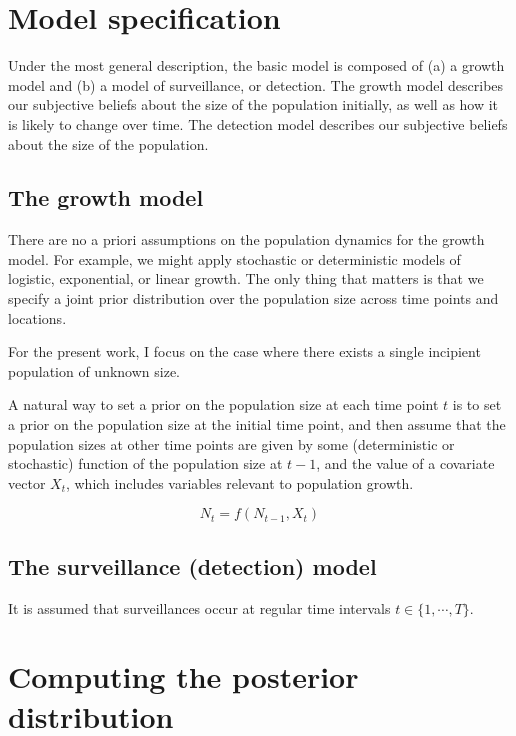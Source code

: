 \documentclass[
]{book}
\begin{document}
\hypertarget{model-specification-1}{%
\section{Model specification}\label{model-specification-1}}

Under the most general description, the basic model is composed of (a) a growth model and (b) a model of surveillance, or detection. The growth model describes our subjective beliefs about the size of the population initially, as well as how it is likely to change over time. The detection model describes our subjective beliefs about the size of the population.

\hypertarget{the-growth-model}{%
\subsection{The growth model}\label{the-growth-model}}

There are no a priori assumptions on the population dynamics for the growth model. For example, we might apply stochastic or deterministic models of logistic, exponential, or linear growth. The only thing that matters is that we specify a joint prior distribution over the population size across time points and locations.

For the present work, I focus on the case where there exists a single incipient population of unknown size.

A natural way to set a prior on the population size at each time point \(t\) is to set a prior on the population size at the initial time point, and then assume that the population sizes at other time points are given by some (deterministic or stochastic) function of the population size at \(t-1\), and the value of a covariate vector \(X_t\), which includes variables relevant to population growth.

\[
N_t = f(N_{t-1}, X_t)
\]

\hypertarget{the-surveillance-detection-model}{%
\subsection{The surveillance (detection) model}\label{the-surveillance-detection-model}}

It is assumed that surveillances occur at regular time intervals \(t \in \{1, \cdots, T\}\).

\hypertarget{computing-the-posterior-distribution}{%
\section{Computing the posterior distribution}\label{computing-the-posterior-distribution}}
\end{document}
